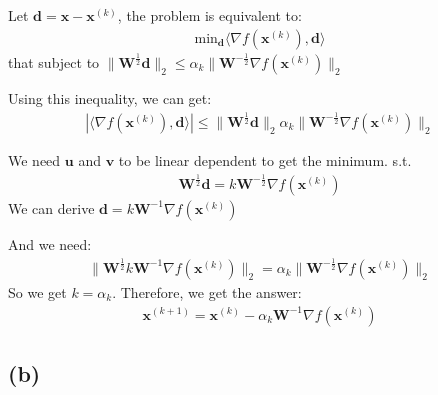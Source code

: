 \documentclass{article}
\begin{document}
Let \(\bm{d} = \bm{x} - \bm{x}^{(k)}\), the problem is equivalent to:
\begin{align*}
    \text{min}_{\bm{d}} \langle \nabla f(\bm{x}^{(k)}), \bm{d} \rangle
\end{align*}
that subject to \(\|\bm{W}^{\frac{1}{2} }\bm{d}\|_2 \leq \alpha_k\|\bm{W}^{-\frac{1}{2}} \nabla f(\bm{x}^{(k)})\|_2\)

Using this inequality, we can get:
\begin{align*}
    |\langle \nabla f(\bm{x}^{(k)}), \bm{d}\rangle| \leq \|\bm{W}^{\frac{1}{2} }\bm{d}\|_2 \alpha_k\|\bm{W}^{-\frac{1}{2}} \nabla f(\bm{x}^{(k)})\|_2
\end{align*}

We need \(\bm{u}\) and \(\bm{v}\) to be linear dependent to get the minimum. s.t.
\begin{align*}
    \bm{W}^{\frac{1}{2} }\bm{d}  = k \bm{W}^{-\frac{1}{2}} \nabla f(\bm{x}^{(k)})
\end{align*}
We can derive \(\bm{d} = k \bm{W}^{-1} \nabla f(\bm{x}^{(k)})\)

And we need:
\begin{align*}
    \|\bm{W}^{\frac{1}{2}}k \bm{W}^{-1} \nabla f(\bm{x}^{(k)})\|_2 = \alpha_k\|\bm{W}^{-\frac{1}{2}} \nabla f(\bm{x}^{(k)})\|_2
\end{align*}
So we get \(k = \alpha_k\). Therefore, we get the answer:
\begin{align*}
    \bm{x}^{(k + 1)} = \bm{x}^{(k)} - \alpha_k \bm{W}^{-1} \nabla f(\bm{x}^{(k)})
\end{align*}


\subsection*{(b)}
\end{document}
